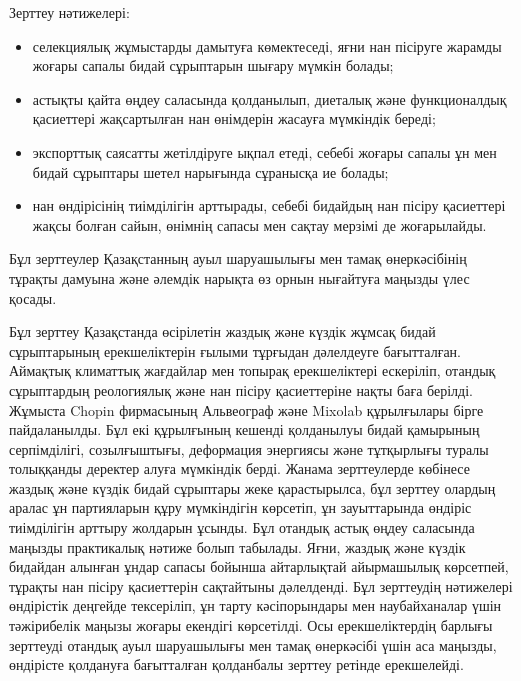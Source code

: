 {{Зерттеу нәтижелері:

\begin{itemize}
\item
  селекциялық жұмыстарды дамытуға көмектеседі, яғни нан пісіруге жарамды
  жоғары сапалы бидай сұрыптарын шығару мүмкін болады;
\item
  астықты қайта өңдеу саласында қолданылып, диеталық және функционалдық
  қасиеттері жақсартылған нан өнімдерін жасауға мүмкіндік береді;
\item
  экспорттық саясатты жетілдіруге ықпал етеді, себебі жоғары сапалы ұн
  мен бидай сұрыптары шетел нарығында сұранысқа ие болады;
\item
  нан өндірісінің тиімділігін арттырады, себебі бидайдың нан пісіру
  қасиеттері жақсы болған сайын, өнімнің сапасы мен сақтау мерзімі де
  жоғарылайды.
\end{itemize}

Бұл зерттеулер Қазақстанның ауыл шаруашылығы мен тамақ өнеркәсібінің
тұрақты дамуына және әлемдік нарықта өз орнын нығайтуға маңызды үлес
қосады.

Бұл зерттеу Қазақстанда өсірілетін жаздық және күздік жұмсақ бидай
сұрыптарының ерекшеліктерін ғылыми тұрғыдан дәлелдеуге бағытталған.
Аймақтық климаттық жағдайлар мен топырақ ерекшеліктері ескеріліп,
отандық сұрыптардың реологиялық және нан пісіру қасиеттеріне нақты баға
берілді. Жұмыста Chopin фирмасының Альвеограф және Mixolab құрылғылары
бірге пайдаланылды. Бұл екі құрылғының кешенді қолданылуы бидай
қамырының серпімділігі, созылғыштығы, деформация энергиясы және
тұтқырлығы туралы толыққанды деректер алуға мүмкіндік берді. Жанама
зерттеулерде көбінесе жаздық және күздік бидай сұрыптары жеке
қарастырылса, бұл зерттеу олардың аралас ұн партияларын құру мүмкіндігін
көрсетіп, ұн зауыттарында өндіріс тиімділігін арттыру жолдарын ұсынды.
Бұл отандық астық өңдеу саласында маңызды практикалық нәтиже болып
табылады. Яғни, жаздық және күздік бидайдан алынған ұндар сапасы бойынша
айтарлықтай айырмашылық көрсетпей, тұрақты нан пісіру қасиеттерін
сақтайтыны дәлелденді. Бұл зерттеудің нәтижелері өндірістік деңгейде
тексеріліп, ұн тарту кәсіпорындары мен наубайханалар үшін тәжірибелік
маңызы жоғары екендігі көрсетілді. Осы ерекшеліктердің барлығы зерттеуді
отандық ауыл шаруашылығы мен тамақ өнеркәсібі үшін аса маңызды,
өндірісте қолдануға бағытталған қолданбалы зерттеу ретінде ерекшелейді.

}}
